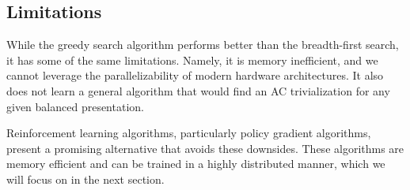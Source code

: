 \subsection{Limitations}

While the greedy search algorithm performs better than the breadth-first search, it has some of the same limitations.
Namely, it is memory inefficient, and we cannot leverage the parallelizability of modern hardware architectures.
It also does not learn a general algorithm that would find an AC trivialization for any given balanced presentation.

Reinforcement learning algorithms, particularly policy gradient algorithms, present a promising alternative that avoids these downsides.
These algorithms are memory efficient and can be trained in a highly distributed manner, which we will focus on in the next section.
